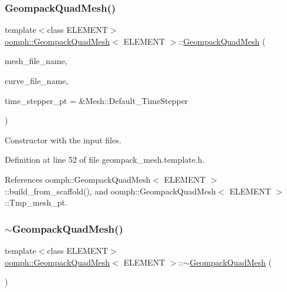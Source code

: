 \subsubsection{\texorpdfstring{Geompack\+Quad\+Mesh()}{GeompackQuadMesh()}}
{\footnotesize\ttfamily template$<$class E\+L\+E\+M\+E\+NT$>$ \\
\hyperlink{classoomph_1_1GeompackQuadMesh}{oomph\+::\+Geompack\+Quad\+Mesh}$<$ E\+L\+E\+M\+E\+NT $>$\+::\hyperlink{classoomph_1_1GeompackQuadMesh}{Geompack\+Quad\+Mesh} (\begin{DoxyParamCaption}\item[{const std\+::string \&}]{mesh\+\_\+file\+\_\+name,  }\item[{const std\+::string \&}]{curve\+\_\+file\+\_\+name,  }\item[{Time\+Stepper $\ast$}]{time\+\_\+stepper\+\_\+pt = {\ttfamily \&Mesh\+:\+:Default\+\_\+TimeStepper} }\end{DoxyParamCaption})\hspace{0.3cm}{\ttfamily [inline]}}



Constructor with the input files. 



Definition at line 52 of file geompack\+\_\+mesh.\+template.\+h.



References oomph\+::\+Geompack\+Quad\+Mesh$<$ E\+L\+E\+M\+E\+N\+T $>$\+::build\+\_\+from\+\_\+scaffold(), and oomph\+::\+Geompack\+Quad\+Mesh$<$ E\+L\+E\+M\+E\+N\+T $>$\+::\+Tmp\+\_\+mesh\+\_\+pt.

\mbox{\label{classoomph_1_1GeompackQuadMesh_a7795c44ea2da182fbeffa30808481ffb}} 
\subsubsection{\texorpdfstring{$\sim$\+Geompack\+Quad\+Mesh()}{~GeompackQuadMesh()}}
{\footnotesize\ttfamily template$<$class E\+L\+E\+M\+E\+NT$>$ \\
\hyperlink{classoomph_1_1GeompackQuadMesh}{oomph\+::\+Geompack\+Quad\+Mesh}$<$ E\+L\+E\+M\+E\+NT $>$\+::$\sim$\hyperlink{classoomph_1_1GeompackQuadMesh}{Geompack\+Quad\+Mesh} (\begin{DoxyParamCaption}{ }\end{DoxyParamCaption})\hspace{0.3cm}{\ttfamily [inline]}}



